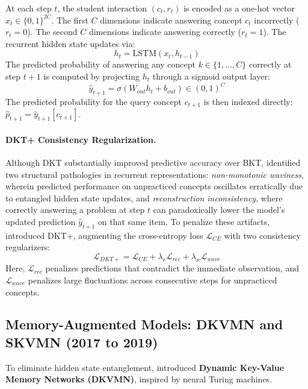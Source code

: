 \documentclass[11pt]{article}
\begin{document}
At each step $t$, the student interaction $(c_t, r_t)$ is encoded as a one-hot vector $x_t \in \{0, 1\}^{2C}$. The first $C$ dimensions indicate answering concept $c_t$ incorrectly ($r_t = 0$). The second $C$ dimensions indicate answering correctly ($r_t = 1$). The recurrent hidden state updates via:
\begin{equation}
h_t = \text{LSTM}(x_t, h_{t-1})
\end{equation}
The predicted probability of answering any concept $k \in \{1, \dots, C\}$ correctly at step $t+1$ is computed by projecting $h_t$ through a sigmoid output layer:
\begin{equation}
\hat{y}_{t+1} = \sigma(W_{out} h_t + b_{out}) \in (0, 1)^C
\end{equation}
The predicted probability for the query concept $c_{t+1}$ is then indexed directly: $\hat{p}_{t+1} = \hat{y}_{t+1}[c_{t+1}]$.

\paragraph{DKT+ Consistency Regularization.}
Although DKT substantially improved predictive accuracy over BKT, \citet{yeung2018addressing} identified two structural pathologies in recurrent representations: \emph{non-monotonic waviness}, wherein predicted performance on unpracticed concepts oscillates erratically due to entangled hidden state updates, and \emph{reconstruction inconsistency}, where correctly answering a problem at step $t$ can paradoxically lower the model's updated prediction $\hat{y}_{t+1}$ on that same item. To penalize these artifacts, \citet{yeung2018addressing} introduced \textsc{DKT+}, augmenting the cross-entropy loss $\mathcal{L}_{CE}$ with two consistency regularizers:
\begin{equation}
\mathcal{L}_{DKT+} = \mathcal{L}_{CE} + \lambda_r \mathcal{L}_{rec} + \lambda_w \mathcal{L}_{wave}
\end{equation}
Here, $\mathcal{L}_{rec}$ penalizes predictions that contradict the immediate observation, and $\mathcal{L}_{wave}$ penalizes large fluctuations across consecutive steps for unpracticed concepts.

\subsection{Memory-Augmented Models: DKVMN and SKVMN (2017 to 2019)}
To eliminate hidden state entanglement, \citet{zhang2017dynamic} introduced \textbf{Dynamic Key-Value Memory Networks (\textsc{DKVMN})}, inspired by neural Turing machines. 
\end{document}
